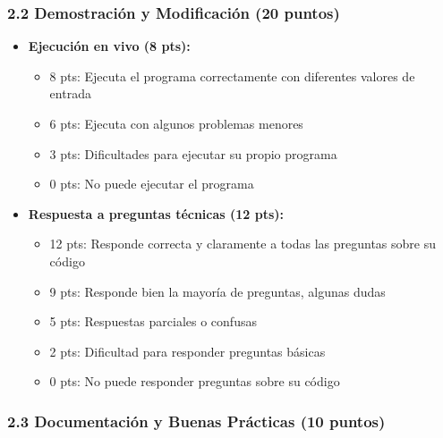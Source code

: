 \documentclass[12pt,a4paper]{article}
\begin{document}
\subsubsection{2.2 Demostración y Modificación (20 puntos)}

\begin{itemize}[leftmargin=*]
    \item \textbf{Ejecución en vivo (8 pts):}
    \begin{itemize}
        \item 8 pts: Ejecuta el programa correctamente con diferentes valores de entrada
        \item 6 pts: Ejecuta con algunos problemas menores
        \item 3 pts: Dificultades para ejecutar su propio programa
        \item 0 pts: No puede ejecutar el programa
    \end{itemize}
    
    \item \textbf{Respuesta a preguntas técnicas (12 pts):}
    \begin{itemize}
        \item 12 pts: Responde correcta y claramente a todas las preguntas sobre su código
        \item 9 pts: Responde bien la mayoría de preguntas, algunas dudas
        \item 5 pts: Respuestas parciales o confusas
        \item 2 pts: Dificultad para responder preguntas básicas
        \item 0 pts: No puede responder preguntas sobre su código
    \end{itemize}
\end{itemize}

\subsubsection{2.3 Documentación y Buenas Prácticas (10 puntos)}
\end{document}
